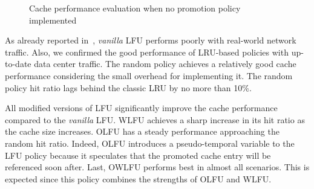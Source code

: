 \begin{figure}[!t]
{		\label{fig:weighted_hit_ratio_sf10}
	}
	\caption{Cache performance evaluation when no promotion policy implemented}
	\label{fig:hit_ratio}
\end{figure}

As already reported in~\cite{Kim:09}, \textit{vanilla} LFU performs poorly with real-world network traffic.
Also, we confirmed the good performance of LRU-based policies with up-to-date data center traffic. 
The random policy achieves a relatively good cache performance considering the small overhead for implementing it.
The random policy hit ratio lags behind the classic LRU by no more than 10\%.

All modified versions of LFU significantly improve the cache performance compared to the \textit{vanilla} LFU.
WLFU achieves a sharp increase in its hit ratio as the cache size increases.
OLFU has a steady performance approaching the random hit ratio.
Indeed, OLFU introduces a pseudo-temporal variable to the LFU policy because it speculates that the promoted cache entry will be referenced soon after. 
Last, OWLFU performs best in almost all scenarios.
This is expected since this policy combines the strengths of OLFU and WLFU.

